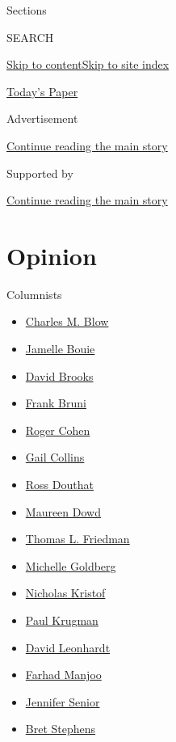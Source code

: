 Sections

SEARCH

\protect\hyperlink{site-content}{Skip to
content}\protect\hyperlink{site-index}{Skip to site index}

\href{https://myaccount.nytimes.com/auth/login?response_type=cookie\&client_id=vi}{}

\href{https://www.nytimes.com/section/todayspaper}{Today's Paper}

Advertisement

\protect\hyperlink{after-top}{Continue reading the main story}

Supported by

\protect\hyperlink{after-sponsor}{Continue reading the main story}

\hypertarget{opinion}{%
\section{Opinion}\label{opinion}}

Columnists

\begin{itemize}
\tightlist
\item
  \href{/column/charles-m-blow}{Charles M. Blow}
\item
  \href{/column/jamelle-bouie}{Jamelle Bouie}
\item
  \href{/column/david-brooks}{David Brooks}
\item
  \href{/column/frank-bruni}{Frank Bruni}
\item
  \href{/column/roger-cohen}{Roger Cohen}
\item
  \href{/column/gail-collins}{Gail Collins}
\item
  \href{/column/ross-douthat}{Ross Douthat}
\item
  \href{/column/maureen-dowd}{Maureen Dowd}
\item
  \href{/column/thomas-l-friedman}{Thomas L. Friedman}
\item
  \href{/column/michelle-goldberg}{Michelle Goldberg}
\item
  \href{/column/nicholas-kristof}{Nicholas Kristof}
\item
  \href{/column/paul-krugman}{Paul Krugman}
\item
  \href{/column/david-leonhardt}{David Leonhardt}
\item
  \href{/column/farhad-manjoo}{Farhad Manjoo}
\item
  \href{/column/jennifer-senior}{Jennifer Senior}
\item
  \href{/column/bret-stephens}{Bret Stephens}
\end{itemize}

